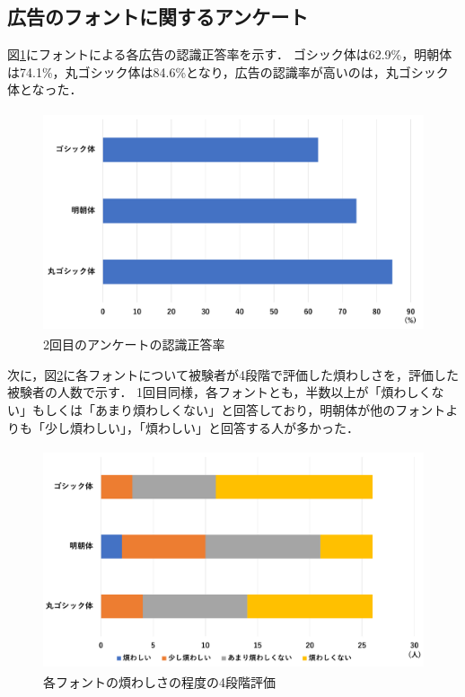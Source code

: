 \documentclass[12pt,a4j,titlepage]{ltjsarticle}
\begin{document}
\subsection{広告のフォントに関するアンケート}
図\ref{fig:広告認識正答率_2}にフォントによる各広告の認識正答率を示す．
ゴシック体は62.9\%，明朝体は74.1\%，丸ゴシック体は84.6\%となり，広告の認識率が高いのは，丸ゴシック体となった．

\begin{figure}[H]
\begin{center}
 \includegraphics[height=65mm]{figures/広告認識正答率_2.pdf}
\end{center}
 \caption{2回目のアンケートの認識正答率}
 \label{fig:広告認識正答率_2}
\end{figure}

次に，図\ref{fig:煩わしさ_2}に各フォントについて被験者が4段階で評価した煩わしさを，評価した被験者の人数で示す．
1回目同様，各フォントとも，半数以上が「煩わしくない」もしくは「あまり煩わしくない」と回答しており，明朝体が他のフォントよりも「少し煩わしい」，「煩わしい」と回答する人が多かった．

\begin{figure}[H]
\begin{center}
 \includegraphics[height=65mm]{figures/煩わしさ_2.pdf}
\end{center}
 \caption{各フォントの煩わしさの程度の4段階評価}
 \label{fig:煩わしさ_2}
\end{figure}
\end{document}
